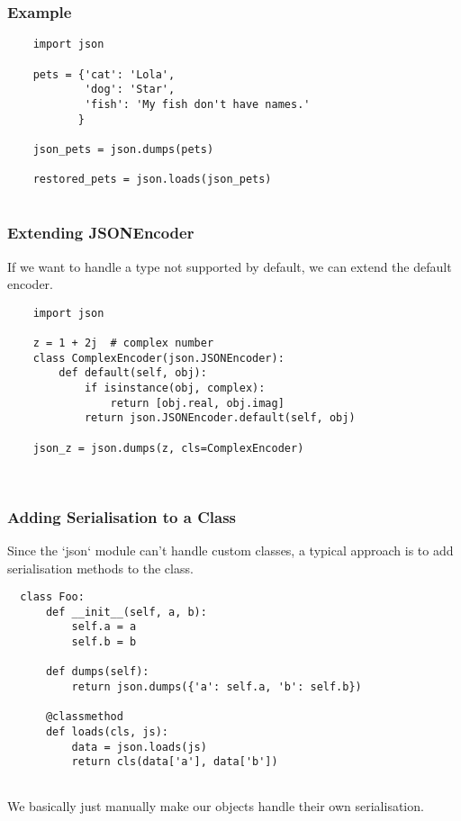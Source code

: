 \documentclass[10pt]{beamer}
\begin{document}
\begin{frame}[fragile]
  \frametitle{Example}
  
  \begin{verbatim}
    import json
    
    pets = {'cat': 'Lola',
            'dog': 'Star',
            'fish': 'My fish don't have names.'
           }    
           
    json_pets = json.dumps(pets)
    
    restored_pets = json.loads(json_pets)       
    
   \end{verbatim} 
    
\end{frame}

\begin{frame}[fragile]
  \frametitle{Extending JSONEncoder}
  
  If we want to handle a type not supported by default, we 
  can extend the default encoder.
  \begin{verbatim}
    import json
    
    z = 1 + 2j  # complex number
    class ComplexEncoder(json.JSONEncoder):
        def default(self, obj):
            if isinstance(obj, complex):
                return [obj.real, obj.imag] 
            return json.JSONEncoder.default(self, obj)
            
    json_z = json.dumps(z, cls=ComplexEncoder)               
    
    
   \end{verbatim} 
    
\end{frame}

\begin{frame}[fragile]
  \frametitle{Adding Serialisation to a Class}
  
  Since the `json` module can't handle custom classes, a typical approach
  is to add serialisation methods to the class.
  \begin{verbatim}
  class Foo:
      def __init__(self, a, b):
          self.a = a
          self.b = b
          
      def dumps(self):
          return json.dumps({'a': self.a, 'b': self.b})
          
      @classmethod
      def loads(cls, js):
          data = json.loads(js)
          return cls(data['a'], data['b'])         
                     
  \end{verbatim} 
   
  We basically just manually make our objects handle their own serialisation. 
\end{frame}
\end{document}
